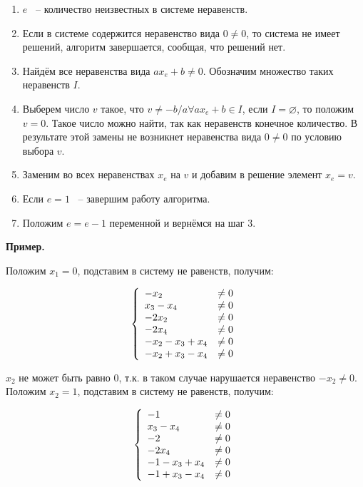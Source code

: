 \documentclass[14pt]{mmcs-article}
\begin{document}
\begin{enumerate}
    \item $e$ ~-- количество неизвестных в системе неравенств.
    \item Если в системе содержится неравенство вида $0 \neq 0$, то система не имеет решений, алгоритм завершается, сообщая, что решений нет.
    \item Найдём все неравенства вида $a x_e + b \neq 0$. Обозначим множество таких неравенств $I$.
    \item Выберем число $v$ такое, что $v \neq -b/a \forall a x_e + b \in I$, если $I = \varnothing$, то положим $v = 0$. Такое число можно найти, так как неравенств конечное количество. В результате этой замены не возникнет неравенства вида $0 \neq 0$ по условию выбора $v$.
    \item Заменим во всех неравенствах $x_e$ на $v$ и добавим в решение элемент $x_e = v$.
    \item Если $e = 1$ ~-- завершим работу алгоритма.
    \item Положим $e = e - 1$ переменной и вернёмся на шаг 3.
\end{enumerate}

\textbf{Пример.}

Положим $x_1 = 0$, подставим в систему не равенств, получим:

\begin{equation}
    \centering
    \left\{
        \begin{array}{ll}
            - x_2 &\neq 0\\
            x_3 - x_4 &\neq 0\\
            - 2 x_2 &\neq 0\\
            - 2 x_4 &\neq 0\\
            - x_2 - x_3 + x_4 &\neq 0\\
            - x_2 + x_3 - x_4 &\neq 0\\
        \end{array}
    \right.
    \label{eqs:cycle_search_neqs}
\end{equation}

$x_2$ не может быть равно $0$, т.к. в таком случае нарушается неравенство $- x_2 \neq 0$. Положим $x_2 = 1$, подставим в систему не равенств, получим:

\begin{equation}
    \centering
    \left\{
        \begin{array}{ll}
            - 1 &\neq 0\\
            x_3 - x_4 &\neq 0\\
            - 2 &\neq 0\\
            - 2 x_4 &\neq 0\\
            - 1 - x_3 + x_4 &\neq 0\\
            - 1 + x_3 - x_4 &\neq 0\\
        \end{array}
    \right.
    \label{eqs:cycle_search_neqs}
\end{equation}
\end{document}
